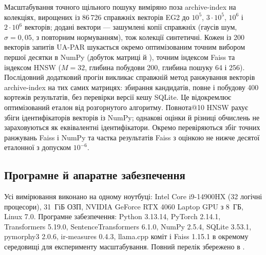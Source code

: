 Масштабування точного щільного пошуку виміряно поза archive-index на колекціях, вирощених із 86\,726 справжніх векторів EG2 до $10^5$, $3\cdot10^5$, $10^6$ і $2\cdot10^6$ векторів; додані вектори --- зашумлені копії справжніх (гаусів шум, $\sigma=0{,}05$, з повторним нормуванням), тож колекції синтетичні. Кожен із 200 векторів запитів UA-PAR шукається окремо оптимізованим точним вибором першої десятки в NumPy (добуток матриці й ), точним індексом Faiss та індексом HNSW ($M=32$, глибина побудови 200, глибина пошуку 64 і 256). Послідовний додатковий прогін викликає справжній метод ранжування векторів archive-index на тих самих матрицях: збирання кандидатів, повне  і побудову 400 кортежів результатів, без перевірки версії кешу SQLite. Це відокремлює оптимізований еталон від розгорнутого алгоритму. Повнота@10 HNSW рахує збіги ідентифікаторів векторів із NumPy; однакові оцінки й різниці обчислень не зараховуються як еквівалентні ідентифікатори. Окремо перевіряються збіг точних ранжувань Faiss і NumPy та частка результатів Faiss з оцінкою не нижче десятої еталонної з допуском $10^{-6}$.

\subsection{Програмне й апаратне забезпечення}
Усі вимірювання виконано на одному ноутбуці: Intel Core i9-14900HX (32 логічні процесори), 31~ГіБ ОЗП, NVIDIA GeForce RTX 4060 Laptop GPU з 8~ГБ, Linux 7.0. Програмне забезпечення: Python 3.13.14, PyTorch 2.14.1, Transformers 5.19.0, SentenceTransformers 6.1.0, NumPy 2.5.4, SQLite 3.53.1, pymorphy3 2.0.6, ir-measures 0.4.3, llama.cpp коміт  і Faiss 1.15.1 в окремому середовищі для експерименту масштабування. Повний перелік збережено в .

